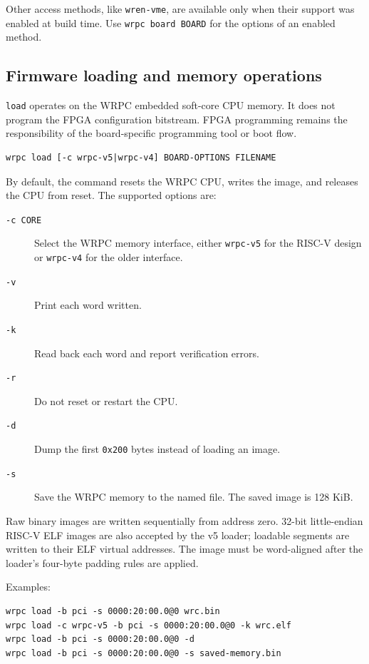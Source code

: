 \documentclass[a4paper,12pt]{article}
\begin{document}
Other access methods, like \texttt{wren-vme}, are available only when their support
was enabled at build time. Use \texttt{wrpc board BOARD} for the options of an
enabled method.

\subsection{Firmware loading and memory operations}

\texttt{load} operates on the WRPC embedded soft-core CPU memory. It does not program
the FPGA configuration bitstream. FPGA programming remains the responsibility
of the board-specific programming tool or boot flow.

\begin{lstlisting}
wrpc load [-c wrpc-v5|wrpc-v4] BOARD-OPTIONS FILENAME
\end{lstlisting}

By default, the command resets the WRPC CPU, writes the image, and releases
the CPU from reset. The supported options are:

\begin{description}
\item[\texttt{-c CORE}] Select the WRPC memory interface, either
  \texttt{wrpc-v5} for the RISC-V design or \texttt{wrpc-v4} for the older
  interface.
\item[\texttt{-v}] Print each word written.
\item[\texttt{-k}] Read back each word and report verification errors.
\item[\texttt{-r}] Do not reset or restart the CPU.
\item[\texttt{-d}] Dump the first \texttt{0x200} bytes instead of loading an
  image.
\item[\texttt{-s}] Save the WRPC memory to the named file. The saved image is
  128 KiB.
\end{description}

Raw binary images are written sequentially from address zero. 32-bit
little-endian RISC-V ELF images are also accepted by the v5 loader; loadable
segments are written to their ELF virtual addresses. The image must be
word-aligned after the loader's four-byte padding rules are applied.

Examples:

\begin{lstlisting}
wrpc load -b pci -s 0000:20:00.0@0 wrc.bin
wrpc load -c wrpc-v5 -b pci -s 0000:20:00.0@0 -k wrc.elf
wrpc load -b pci -s 0000:20:00.0@0 -d
wrpc load -b pci -s 0000:20:00.0@0 -s saved-memory.bin
\end{lstlisting}
\end{document}
